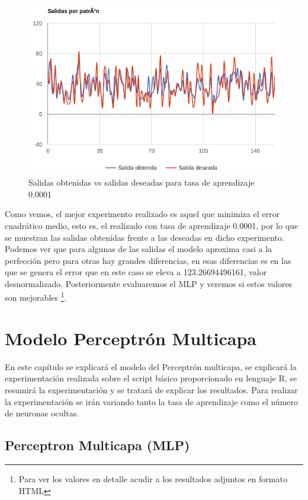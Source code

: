 \documentclass[11pt,spanish,listoffigures,listoftables]{tfgetsinf}
\begin{document}
\begin{figure}[H]
\centering
\includegraphics[scale=0.5]{bestadaline}
\caption{Salidas obtenidas vs salidas deseadas para tasa de aprendizaje 0.0001}\label{fig:bestadaline}
\end{figure}

\par Como vemos, el mejor experimento realizado es aquel que minimiza el error cuadrático medio, esto es, el realizado con tasa de aprendizaje 0.0001, por lo que se muestran las salidas obtenidas frente a las deseadas en dicho experimento. Podemos ver que para algunas de las salidas el modelo aproxima casi a la perfección pero para otras hay grandes diferencias, en esas diferencias es en las que se genera el error que en este caso se eleva a 123.26694496161, valor desnormalizado. Posteriormente evaluaremos el MLP y veremos si estos valores son mejorables \footnote{Para ver los valores en detalle acudir a los resultados adjuntos en formato HTML}.

\chapter{Modelo Perceptrón Multicapa}

\par En este capítulo se explicará el modelo del Perceptrón multicapa, se explicará la experimentación realizada sobre el script básico proporcionado en lenguaje R, se resumirá la experimentación y se tratará de explicar los resultados. Para realizar la experimentación se irán variando tanto la tasa de aprendizaje como el número de neuronas ocultas.

\section{Perceptron Multicapa (MLP)}
\end{document}
